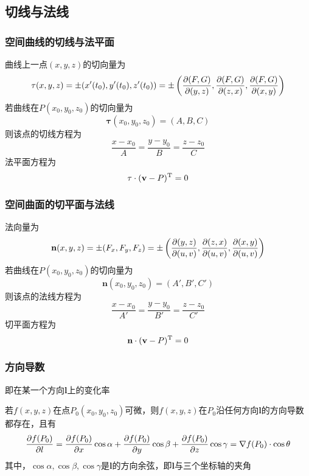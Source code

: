 \subsection{切线与法线}
\subsubsection{空间曲线的切线与法平面}
曲线上一点$(x,y,z)$的切向量为
\[\mathbf{\tau}(x,y,z)=\pm(x'(t_0),y'(t_0),z'(t_0))=\pm\left(\dfrac{\partial (F,G)}{\partial (y,z)},\dfrac{\partial (F,G)}{\partial (z,x)},\dfrac{\partial (F,G)}{\partial (x,y)}\right)\]
若曲线在$P(x_0,y_0,z_0)$的切向量为
\[\mathbf{\tau}(x_0,y_0,z_0)=(A,B,C)\]
则该点的切线方程为
\[\frac{x-x_0}{A}=\frac{y-y_0}{B}=\frac{z-z_0}{C}\]
法平面方程为
\[\mathbf{\tau}\cdot(\mathbf{v}-P)^{\mathrm{T}}=0\]

\subsubsection{空间曲面的切平面与法线}
法向量为
\[\mathbf{n}(x,y,z)=\pm(F_x,F_y,F_z)=\pm\left(\dfrac{\partial (y,z)}{\partial (u,v)},\dfrac{\partial (z,x)}{\partial (u,v)},\dfrac{\partial (x,y)}{\partial (u,v)}\right)\]
若曲线在$P(x_0,y_0,z_0)$的切向量为
\[\mathbf{n}(x_0,y_0,z_0)=(A',B',C')\]
则该点的法线方程为
\[\frac{x-x_0}{A'}=\frac{y-y_0}{B'}=\frac{z-z_0}{C'}\]
切平面方程为
\[\mathbf{n}\cdot(\mathbf{v}-P)^{\mathrm{T}}=0\]

\subsubsection{方向导数}
即在某一个方向$\mathbf{l}$上的变化率
\begin{theorem}
若$f(x,y,z)$在点$P_0(x_0,y_0,z_0)$可微，则$f(x,y,z)$在$P_0$沿任何方向$\mathbf{l}$的方向导数都存在，且有
\[\dfrac{\partial f(P_0)}{\partial l}=\dfrac{\partial f(P_0)}{\partial x}\cos\alpha+\dfrac{\partial f(P_0)}{\partial y}\cos\beta+\dfrac{\partial f(P_0)}{\partial z}\cos\gamma=\nabla f(P_0)\cdot\cos\theta\]
其中，$\cos\alpha,\cos\beta,\cos\gamma$是$\mathbf{l}$的方向余弦，即$\mathbf{l}$与三个坐标轴的夹角
\end{theorem}
